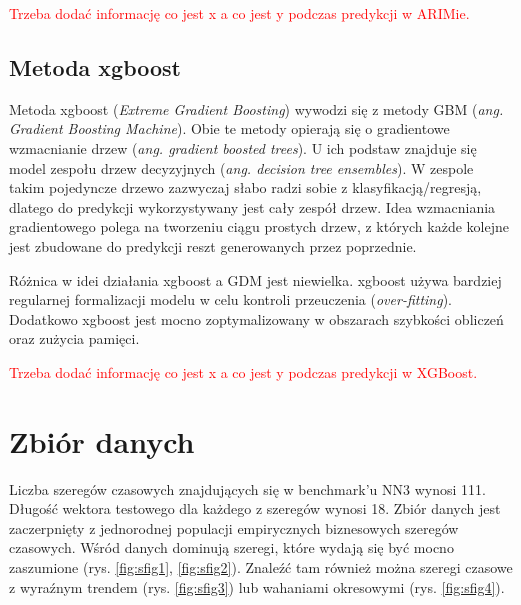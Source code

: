 \documentclass[11pt]{report}
\begin{document}
\textcolor{red}{Trzeba dodać informację co jest x a co jest y podczas predykcji w ARIMie.}

\subsection{Metoda xgboost}
Metoda xgboost (\textit{Extreme Gradient Boosting}) wywodzi się z metody GBM (\textit{ang. Gradient Boosting Machine}).
Obie te metody opierają się o gradientowe wzmacnianie drzew (\textit{ang. gradient boosted trees}).
U ich podstaw znajduje się model zespołu drzew decyzyjnych (\textit{ang. decision tree ensembles}).
W zespole takim pojedyncze drzewo zazwyczaj słabo radzi sobie z klasyfikacją/regresją, dlatego do predykcji wykorzystywany jest cały zespół drzew.
Idea wzmacniania gradientowego polega na tworzeniu ciągu prostych drzew, z których każde kolejne jest zbudowane do predykcji reszt generowanych przez poprzednie.

Różnica w idei działania xgboost a GDM jest niewielka.
xgboost używa bardziej regularnej formalizacji modelu w celu kontroli przeuczenia (\textit{over-fitting}).
Dodatkowo xgboost jest mocno zoptymalizowany w obszarach szybkości obliczeń oraz zużycia pamięci.

\textcolor{red}{Trzeba dodać informację co jest x a co jest y podczas predykcji w XGBoost.}

\section{Zbiór danych}
Liczba szeregów czasowych znajdujących się w benchmark'u NN3 wynosi 111.
Długość wektora testowego dla każdego z szeregów wynosi 18.
Zbiór danych jest zaczerpnięty z jednorodnej populacji empirycznych biznesowych szeregów czasowych.
Wśród danych dominują szeregi, które wydają się być mocno zaszumione (rys. \ref{fig:sfig1}, \ref{fig:sfig2}).
Znaleźć tam również można szeregi czasowe z wyraźnym trendem (rys. \ref{fig:sfig3}) lub wahaniami okresowymi (rys. \ref{fig:sfig4}).
\end{document}
